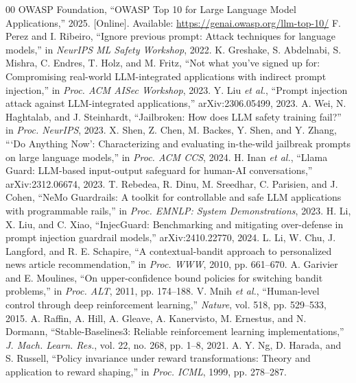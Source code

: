 \documentclass[conference]{IEEEtran}
\begin{document}
\begin{thebibliography}{00}
\footnotesize
{} OWASP Foundation, ``OWASP Top 10 for Large Language Model Applications,'' 2025. [Online]. Available: \url{https://genai.owasp.org/llm-top-10/}
 F. Perez and I. Ribeiro, ``Ignore previous prompt: Attack techniques for language models,'' in \textit{NeurIPS ML Safety Workshop}, 2022.
 K. Greshake, S. Abdelnabi, S. Mishra, C. Endres, T. Holz, and M. Fritz, ``Not what you've signed up for: Compromising real-world LLM-integrated applications with indirect prompt injection,'' in \textit{Proc. ACM AISec Workshop}, 2023.
 Y. Liu \textit{et al.}, ``Prompt injection attack against LLM-integrated applications,'' arXiv:2306.05499, 2023.
 A. Wei, N. Haghtalab, and J. Steinhardt, ``Jailbroken: How does LLM safety training fail?'' in \textit{Proc. NeurIPS}, 2023.
 X. Shen, Z. Chen, M. Backes, Y. Shen, and Y. Zhang, ```Do Anything Now': Characterizing and evaluating in-the-wild jailbreak prompts on large language models,'' in \textit{Proc. ACM CCS}, 2024.
 H. Inan \textit{et al.}, ``Llama Guard: LLM-based input-output safeguard for human-AI conversations,'' arXiv:2312.06674, 2023.
 T. Rebedea, R. Dinu, M. Sreedhar, C. Parisien, and J. Cohen, ``NeMo Guardrails: A toolkit for controllable and safe LLM applications with programmable rails,'' in \textit{Proc. EMNLP: System Demonstrations}, 2023.
 H. Li, X. Liu, and C. Xiao, ``InjecGuard: Benchmarking and mitigating over-defense in prompt injection guardrail models,'' arXiv:2410.22770, 2024.
 L. Li, W. Chu, J. Langford, and R. E. Schapire, ``A contextual-bandit approach to personalized news article recommendation,'' in \textit{Proc. WWW}, 2010, pp. 661--670.
 A. Garivier and E. Moulines, ``On upper-confidence bound policies for switching bandit problems,'' in \textit{Proc. ALT}, 2011, pp. 174--188.
 V. Mnih \textit{et al.}, ``Human-level control through deep reinforcement learning,'' \textit{Nature}, vol. 518, pp. 529--533, 2015.
 A. Raffin, A. Hill, A. Gleave, A. Kanervisto, M. Ernestus, and N. Dormann, ``Stable-Baselines3: Reliable reinforcement learning implementations,'' \textit{J. Mach. Learn. Res.}, vol. 22, no. 268, pp. 1--8, 2021.
 A. Y. Ng, D. Harada, and S. Russell, ``Policy invariance under reward transformations: Theory and application to reward shaping,'' in \textit{Proc. ICML}, 1999, pp. 278--287.

\end{thebibliography}
\end{document}

